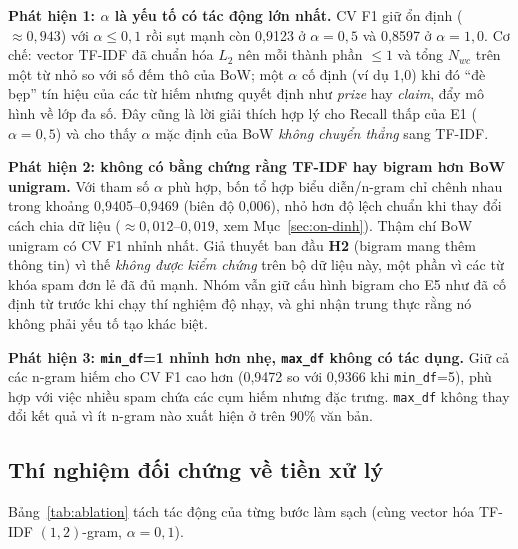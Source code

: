 \textbf{Phát hiện 1: $\alpha$ là yếu tố có tác động lớn nhất.} CV F1 giữ ổn định ($\approx0{,}943$) với $\alpha\le0{,}1$ rồi sụt mạnh còn 0,9123 ở $\alpha=0{,}5$ và 0,8597 ở $\alpha=1{,}0$. Cơ chế: vector TF-IDF đã chuẩn hóa $L_2$ nên mỗi thành phần $\le1$ và tổng $N_{wc}$ trên một từ nhỏ so với số đếm thô của BoW; một $\alpha$ cố định (ví dụ 1,0) khi đó ``đè bẹp'' tín hiệu của các từ hiếm nhưng quyết định như \textit{prize} hay \textit{claim}, đẩy mô hình về lớp đa số. Đây cũng là lời giải thích hợp lý cho Recall thấp của E1 ($\alpha=0{,}5$) và cho thấy $\alpha$ mặc định của BoW \textit{không chuyển thẳng} sang TF-IDF.

\textbf{Phát hiện 2: không có bằng chứng rằng TF-IDF hay bigram hơn BoW unigram.} Với tham số $\alpha$ phù hợp, bốn tổ hợp biểu diễn/n-gram chỉ chênh nhau trong khoảng 0,9405--0,9469 (biên độ 0,006), nhỏ hơn độ lệch chuẩn khi thay đổi cách chia dữ liệu ($\approx0{,}012$--$0{,}019$, xem Mục~\ref{sec:on-dinh}). Thậm chí BoW unigram có CV F1 nhỉnh nhất. Giả thuyết ban đầu \textbf{H2} (bigram mang thêm thông tin) vì thế \textit{không được kiểm chứng} trên bộ dữ liệu này, một phần vì các từ khóa spam đơn lẻ đã đủ mạnh. Nhóm vẫn giữ cấu hình bigram cho E5 như đã cố định từ trước khi chạy thí nghiệm độ nhạy, và ghi nhận trung thực rằng nó không phải yếu tố tạo khác biệt.

\textbf{Phát hiện 3: \texttt{min\_df}=1 nhỉnh hơn nhẹ, \texttt{max\_df} không có tác dụng.} Giữ cả các n-gram hiếm cho CV F1 cao hơn (0,9472 so với 0,9366 khi \texttt{min\_df}=5), phù hợp với việc nhiều spam chứa các cụm hiếm nhưng đặc trưng. \texttt{max\_df} không thay đổi kết quả vì ít n-gram nào xuất hiện ở trên 90\% văn bản.

\subsection{Thí nghiệm đối chứng về tiền xử lý}

Bảng~\ref{tab:ablation} tách tác động của từng bước làm sạch (cùng vector hóa TF-IDF $(1,2)$-gram, $\alpha=0{,}1$).

